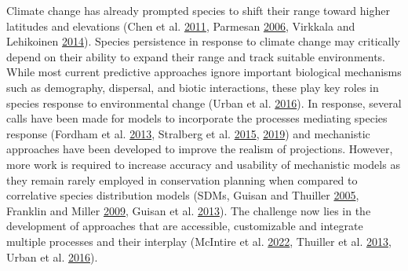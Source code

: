 \documentclass[12pt]{article}
\begin{document}
Climate change has already prompted species to shift their range toward
higher latitudes and elevations (Chen et al.
\protect\hyperlink{ref-chen_rapid_2011}{2011}, Parmesan
\protect\hyperlink{ref-parmesan_ecological_2006}{2006}, Virkkala and
Lehikoinen \protect\hyperlink{ref-virkkala_patterns_2014}{2014}).
Species persistence in response to climate change may critically depend
on their ability to expand their range and track suitable environments.
While most current predictive approaches ignore important biological
mechanisms such as demography, dispersal, and biotic interactions, these
play key roles in species response to environmental change (Urban et al.
\protect\hyperlink{ref-urban_improving_2016}{2016}). In response,
several calls have been made for models to incorporate the processes
mediating species response (Fordham et al.
\protect\hyperlink{ref-fordham_adapted_2013}{2013}, Stralberg et al.
\protect\hyperlink{ref-stralberg_conservation_2015}{2015},
\protect\hyperlink{ref-stralberg_conservation_2019}{2019}) and
mechanistic approaches have been developed to improve the realism of
projections. However, more work is required to increase accuracy and
usability of mechanistic models as they remain rarely employed in
conservation planning when compared to correlative species distribution
models (SDMs, Guisan and Thuiller
\protect\hyperlink{ref-guisan_predicting_2005}{2005}, Franklin and
Miller \protect\hyperlink{ref-franklin_mapping_2009}{2009}, Guisan et
al. \protect\hyperlink{ref-guisan_predicting_2013}{2013}). The challenge
now lies in the development of approaches that are accessible,
customizable and integrate multiple processes and their interplay
(McIntire et al. \protect\hyperlink{ref-mcintire_perfict_2022}{2022},
Thuiller et al. \protect\hyperlink{ref-thuiller_road_2013}{2013}, Urban
et al. \protect\hyperlink{ref-urban_improving_2016}{2016}).
\end{document}
